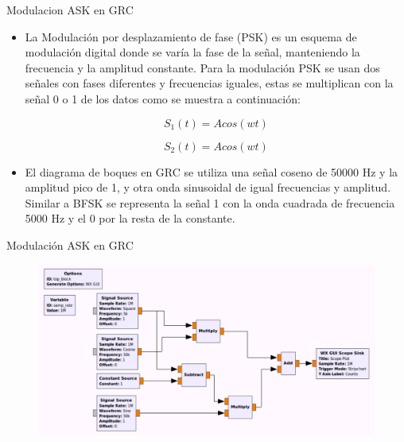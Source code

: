 \begin{frame}{Modulacion ASK en GRC}

  \begin{itemize}
  \item {
La Modulación por desplazamiento de fase (PSK) es un esquema de modulación digital donde se varía la fase de la señal, manteniendo la frecuencia y la amplitud constante. Para la modulación PSK se usan dos señales con fases diferentes y frecuencias iguales, estas se multiplican con la señal 0 o 1 de los datos como se muestra a continuación:

\begin{equation*}
S_{1}(t) = Acos(wt)
\end{equation*}

\begin{equation*}
S_{2}(t) = Acos(wt)
\end{equation*}

  }
  \item {
El diagrama de boques en GRC se utiliza una señal coseno de 50000 Hz y la amplitud pico de 1, y otra onda sinusoidal de igual frecuencias y amplitud. Similar a BFSK se representa la señal 1 con la onda cuadrada de frecuencia 5000 Hz y el 0 por la resta de la constante.
  }
  \end{itemize}
\end{frame}

\begin{frame}{Modulación ASK en GRC}
\begin{figure}[H]
\centering
\includegraphics[width=\textwidth]{parte1/lab4/pdf/lab4_7.pdf}
\end{figure}
\end{frame}

